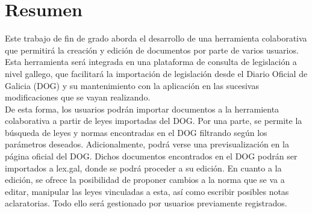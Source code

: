 \pagestyle{plain}
\chapter*{Resumen}
Este trabajo de fin de grado aborda el desarrollo de una herramienta colaborativa que permitirá la creación y edición de documentos por parte de varios usuarios. Esta herramienta será integrada en una plataforma de consulta de legislación a nivel gallego, que facilitará la importación de legislación desde el Diario Oficial de Galicia (DOG) \cite{dog} y su mantenimiento con la aplicación en las sucesivas modificaciones que se vayan realizando.
\\

De esta forma, los usuarios podrán importar documentos a la herramienta colaborativa a partir de leyes importadas del DOG. Por una parte, se permite la búsqueda de leyes y normas encontradas en el DOG filtrando según los parámetros deseados. Adicionalmente, podrá verse una previsualización en la página oficial del DOG. Dichos documentos encontrados en el DOG podrán ser importados a lex.gal, donde se podrá proceder a su edición. En cuanto a la edición, se ofrece la posibilidad de proponer cambios a la norma que se va a editar, manipular las leyes vinculadas a esta, así como escribir posibles notas aclaratorias. Todo ello será gestionado por usuarios previamente registrados.